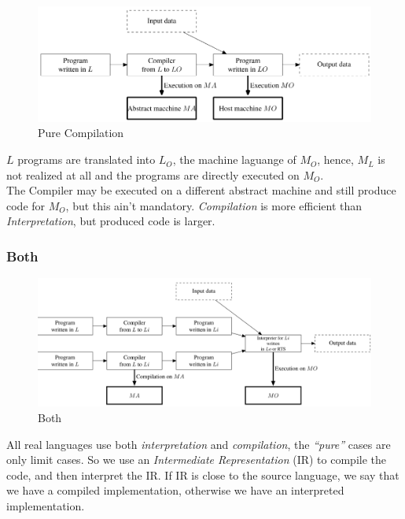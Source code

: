 \begin{figure}[htbp]
    \centering
    \includegraphics{images/am_pure_comp.png}
    \caption{Pure Compilation}
    \label{fig:am_pure_comp.png}
\end{figure}

$L$ programs are translated into $L_O$, the machine laguange of $M_O$,
hence, $M_L$ is not realized at all and the programs are directly executed on $M_O$.\\
The Compiler may be executed on a different abstract machine and still produce code for $M_O$, but this ain't mandatory.
\textit{Compilation} is more efficient than \textit{Interpretation}, 
but produced code is larger.

\subsubsection{Both}

\begin{figure}[htbp]
    \centering
    \includegraphics{images/am_both.png}
    \caption{Both}
    \label{fig:am_both}
\end{figure}

All real languages use both \textit{interpretation} and \textit{compilation}, the \textit{``pure''} cases are only limit cases.
So we use an \textit{Intermediate Representation} (IR) to compile the code, and then interpret the IR.
If IR is close to the source language, we say that we have a compiled implementation, otherwise we have an interpreted implementation.

